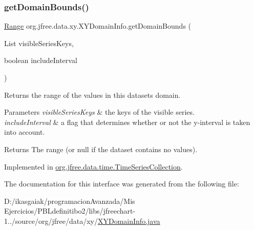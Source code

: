 \subsubsection{\texorpdfstring{get\+Domain\+Bounds()}{getDomainBounds()}}
{\footnotesize\ttfamily \mbox{\hyperlink{classorg_1_1jfree_1_1data_1_1_range}{Range}} org.\+jfree.\+data.\+xy.\+X\+Y\+Domain\+Info.\+get\+Domain\+Bounds (\begin{DoxyParamCaption}\item[{List}]{visible\+Series\+Keys,  }\item[{boolean}]{include\+Interval }\end{DoxyParamCaption})}

Returns the range of the values in this dataset\textquotesingle{}s domain.


\begin{DoxyParams}{Parameters}
{\em visible\+Series\+Keys} & the keys of the visible series. \\
\hline
{\em include\+Interval} & a flag that determines whether or not the y-\/interval is taken into account.\\
\hline
\end{DoxyParams}
\begin{DoxyReturn}{Returns}
The range (or {\ttfamily null} if the dataset contains no values). 
\end{DoxyReturn}


Implemented in \mbox{\hyperlink{classorg_1_1jfree_1_1data_1_1time_1_1_time_series_collection_ac13a6953fa601e775d100b576c73f052}{org.\+jfree.\+data.\+time.\+Time\+Series\+Collection}}.



The documentation for this interface was generated from the following file\+:\begin{DoxyCompactItemize}
\item 
D\+:/ikasgaiak/programacion\+Avanzada/\+Mis Ejercicios/\+P\+B\+Ldefinitibo2/libs/jfreechart-\/1../source/org/jfree/data/xy/\mbox{\hyperlink{_x_y_domain_info_8java}{X\+Y\+Domain\+Info.\+java}}\end{DoxyCompactItemize}
